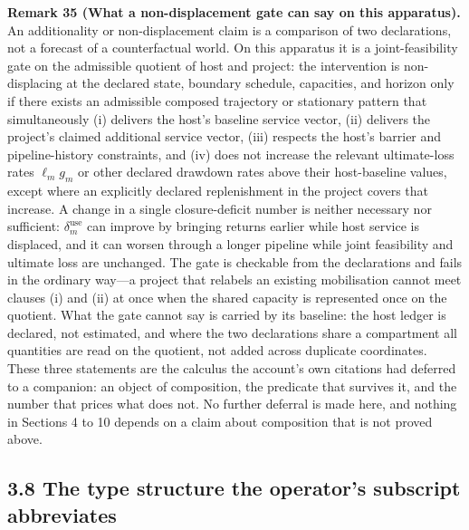 \documentclass[11pt]{article}
\begin{document}
\textbf{Remark 35 (What a non-displacement gate can say on this apparatus).} An additionality or non-displacement claim is a comparison of two declarations, not a forecast of a counterfactual world. On this apparatus it is a joint-feasibility gate on the admissible quotient of host and project: the intervention is non-displacing at the declared state, boundary schedule, capacities, and horizon only if there exists an admissible composed trajectory or stationary pattern that simultaneously (i) delivers the host's baseline service vector, (ii) delivers the project's claimed additional service vector, (iii) respects the host's barrier and pipeline-history constraints, and (iv) does not increase the relevant ultimate-loss rates \(\ell_mg_m\) or other declared drawdown rates above their host-baseline values, except where an explicitly declared replenishment in the project covers that increase. A change in a single closure-deficit number is neither necessary nor sufficient: \(\delta_m^{\mathrm{use}}\) can improve by bringing returns earlier while host service is displaced, and it can worsen through a longer pipeline while joint feasibility and ultimate loss are unchanged. The gate is checkable from the declarations and fails in the ordinary way---a project that relabels an existing mobilisation cannot meet clauses (i) and (ii) at once when the shared capacity is represented once on the quotient. What the gate cannot say is carried by its baseline: the host ledger is declared, not estimated, and where the two declarations share a compartment all quantities are read on the quotient, not added across duplicate coordinates.
These three statements are the calculus the account's own citations had deferred to a companion: an object of composition, the predicate that survives it, and the number that prices what does not. No further deferral is made here, and nothing in Sections 4 to 10 depends on a claim about composition that is not proved above.

\subsection*{3.8 The type structure the operator's subscript abbreviates}\label{38-the-type-structure-the-operators-subscript-abbreviates}
\end{document}
